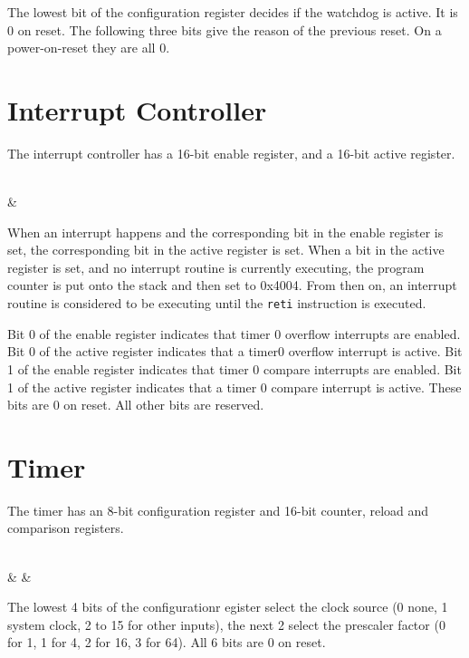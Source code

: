 \documentclass{book}
\begin{document}
The lowest bit of the configuration register decides if the watchdog is active. It is 0 on reset. The following three bits give the reason of the previous reset. On a power-on-reset they are all 0.

\section{Interrupt Controller}

The interrupt controller has a 16-bit enable register, and a 16-bit active register.

\vspace{3mm}
\begin{bytefield}[bitwidth=0.06\linewidth]{8}
	 \\
	 & 
\end{bytefield}

When an interrupt happens and the corresponding bit in the enable register is set, the corresponding bit in the active register is set. When a bit in the active register is set, and no interrupt routine is currently executing, the program counter is put onto the stack and then set to 0x4004. From then on, an interrupt routine is considered to be executing until the \texttt{reti} instruction is executed.

Bit 0 of the enable register indicates that timer 0 overflow interrupts are enabled. Bit 0 of the active register indicates that a timer0 overflow interrupt is active. Bit 1 of the enable register indicates that timer 0 compare interrupts are enabled. Bit 1 of the active register indicates that a timer 0 compare interrupt is active. These bits are 0 on reset. All other bits are reserved.

\section{Timer}

The timer has an 8-bit configuration register and 16-bit counter, reload and comparison registers.

\vspace{3mm}
\begin{bytefield}[bitwidth=0.13\linewidth]{8}
	 \\
	 &  & 
\end{bytefield}

The lowest 4 bits of the configurationr egister select the clock source (0 none, 1 system clock, 2 to 15 for other inputs), the next 2 select the prescaler factor (0 for 1, 1 for 4, 2 for 16, 3 for 64). All 6 bits are 0 on reset.
\end{document}

